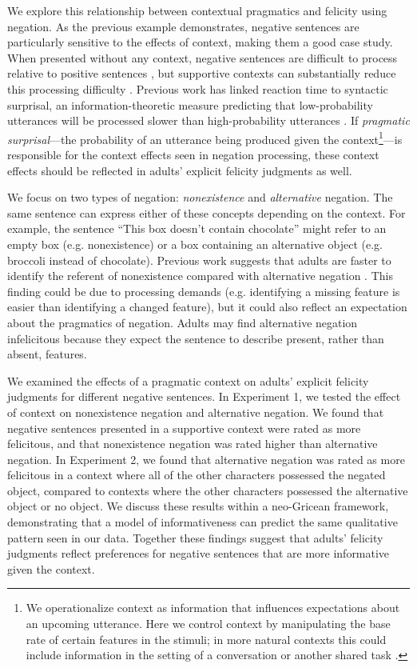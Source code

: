 \documentclass[10pt,letterpaper]{article}
\begin{document}
We explore this relationship between contextual pragmatics and felicity using negation. As the previous example demonstrates, negative sentences are particularly sensitive to the effects of context, making them a good case study.  When presented without any context, negative sentences are difficult to process relative to positive sentences \cite{hclark1972, carpenter1975, just1971, just1976}, but supportive contexts can substantially reduce this processing difficulty \cite{wason1965, glenberg1999, ludtke2006, nieuwland2008, dale2011, nordmeyer2014}.   Previous work has linked reaction time to syntactic surprisal, an information-theoretic measure predicting that low-probability utterances will be processed slower than high-probability utterances \cite{levy2008}.  If \emph{pragmatic surprisal}---the probability of an utterance being produced given the context\footnote{We operationalize context as information that influences expectations about an upcoming utterance.  Here we control context by manipulating the base rate of certain features in the stimuli; in more natural contexts this could include information in the setting of a conversation or another shared task  .}---is responsible for the context effects seen in negation processing, these context effects should be reflected in adults' explicit felicity judgments as well.   

We focus on two types of negation: \emph{nonexistence} and \emph{alternative} negation.  The same sentence can express either of these concepts depending on the context.  For example, the sentence ``This box doesn't contain chocolate'' might refer to an empty box (e.g. nonexistence) or a box containing an alternative object (e.g. broccoli instead of chocolate).  Previous work suggests that adults are faster to identify the referent of nonexistence compared with alternative negation \cite{nordmeyer2013, nordmeyer2014b}.  This finding could be due to processing demands (e.g. identifying a missing feature is easier than identifying a changed feature), but it could also reflect an expectation about the pragmatics of negation.  Adults may find alternative negation infelicitous because they expect the sentence to describe present, rather than absent, features.  

We examined the effects of a pragmatic context on adults' explicit felicity judgments for different negative sentences.  In Experiment 1, we tested the effect of context on nonexistence negation and alternative negation.  We found that negative sentences presented in a supportive context were rated as more felicitous, and that nonexistence negation was rated higher than alternative negation.  In Experiment 2, we found that alternative negation was rated as more felicitous in a context where all of the other characters possessed the negated object, compared to contexts where the other characters possessed the alternative object or no object.  We discuss these results within a neo-Gricean framework, demonstrating that a model of informativeness can predict the same qualitative pattern seen in our data.  Together these findings suggest that adults' felicity judgments reflect preferences for negative sentences that are more informative given the context.  
\end{document}
